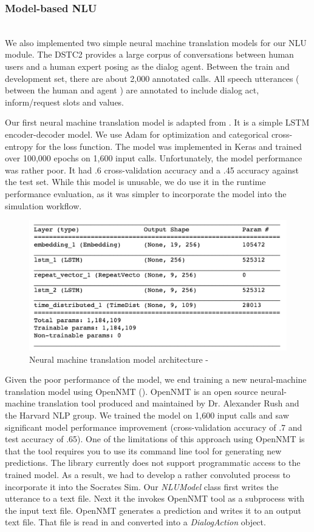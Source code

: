\subsubsection{Model-based NLU}
~ \\
We also implemented two simple neural machine translation models for our NLU module. The DSTC2 provides a large corpus of conversations between human users and a human expert posing as the dialog agent. Between the train and development set, there are about 2,000 annotated calls. All speech utterances ( between the human and agent ) are annotated to include dialog act, inform/request slots and values.

Our first neural machine translation model is adapted from \cite{brownlee_2017}. It is a simple LSTM encoder-decoder model. We use Adam for optimization and categorical cross-entropy for the loss function. The model was implemented in Keras and trained over 100,000 epochs on 1,600 input calls. Unfortunately, the model performance was rather poor. It had .6 cross-validation accuracy and a .45 accuracy against the test set. While this model is unusable, we do use it in the runtime performance evaluation, as it was simpler to incorporate the model into the simulation workflow. 

\begin{figure}[h!]
	\centering
	\includegraphics[scale=.25]{diagrams/simple_nmt.jpeg}
	\caption{ Neural machine translation model architecture  - \cite{brownlee_2017} }
	\label{fig:simple_nmt_model}
\end{figure}

Given the poor performance of the \cite{brownlee_2017} model, we end training a new neural-machine translation model using OpenNMT (\cite{2017opennmt}). OpenNMT is an open source neural-machine translation tool produced and maintained by Dr. Alexander Rush and the Harvard NLP group. We trained the model on 1,600 input calls and saw significant model performance improvement (cross-validation accuracy of .7 and test accuracy of .65). One of the limitations of this approach using OpenNMT is that the tool requires you to use its command line tool for generating new predictions. The library currently does not support programmatic access to the trained model. As a result, we had to develop a rather convoluted process to incorporate it into the Socrates Sim. Our \textit{NLUModel} class first writes the utterance to a text file. Next it the invokes OpenNMT tool as a subprocess with the input text file. OpenNMT generates a prediction and writes it to an output text file. That file is read in and converted into a \textit{DialogAction} object. 

